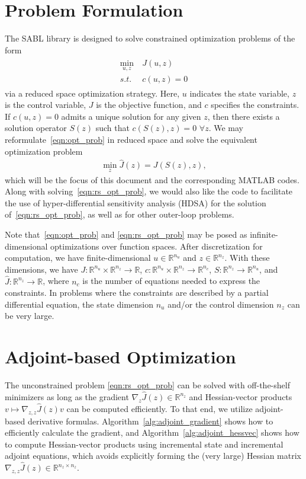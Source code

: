 \documentclass{article}
\def\R{{\mathbb R}}
\begin{document}
\section*{Problem Formulation}

The SABL library is designed to solve constrained optimization problems of the form
\begin{align}
    \label{eqn:opt_prob}
    \begin{aligned}
    \min_{u,z} ~& J(u,z)
    \\
    s.t. ~~& c(u,z) = 0
    \end{aligned}
\end{align}
via a reduced space optimization strategy.
Here, $u$ indicates the state variable, $z$ is the control variable, $J$ is the objective function, and $c$ specifies the constraints.
If $c(u,z)=0$ admits a unique solution for any given $z$, then there exists a solution operator $S(z)$ such that $c(S(z),z)=0$ $\forall z$. We may reformulate~\eqref{eqn:opt_prob} in reduced space and solve the equivalent optimization problem
\begin{align}
    \label{eqn:rs_opt_prob}
    \min_{z } \hat{J}(z)=J(S(z),z),
\end{align}
which will be the focus of this document and the corresponding MATLAB codes. Along with solving~\eqref{eqn:rs_opt_prob}, we would also like the code to facilitate the use of hyper-differential sensitivity analysis (HDSA) for the solution of~\eqref{eqn:rs_opt_prob}, as well as for other outer-loop problems.

Note that~\eqref{eqn:opt_prob} and \eqref{eqn:rs_opt_prob} may be posed as infinite-dimensional optimizations over function spaces.
After discretization for computation, we have finite-dimensional $u\in\R^{n_u}$ and $z\in\R^{n_z}$.
With these dimensions, we have $J:\R^{n_{u}}\times\R^{n_{z}}\to\R$, $c:\R^{n_{u}}\times\R^{n_{z}}\to\R^{n_{c}}$, $S:\R^{n_{z}}\to\R^{n_{u}}$, and $\hat{J}:\R^{n_{z}}\to\R$, where $n_{c}$ is the number of equations needed to express the constraints.
In problems where the constraints are described by a partial differential equation, the state dimension $n_{u}$ and/or the control dimension $n_{z}$ can be very large.

\section*{Adjoint-based Optimization}

The unconstrained problem \eqref{eqn:rs_opt_prob} can be solved with off-the-shelf minimizers as long as the gradient $\nabla_z \hat{J}(z)\in\R^{n_{z}}$ and Hessian-vector products $v\mapsto \nabla_{z,z} \hat{J}(z) v$ can be computed efficiently.
To that end, we utilize adjoint-based derivative formulas.
Algorithm~\ref{alg:adjoint_gradient} shows how to efficiently calculate the gradient, and Algorithm~\ref{alg:adjoint_hessvec} shows how to compute Hessian-vector products using incremental state and incremental adjoint equations, which avoids explicitly forming the (very large) Hessian matrix $\nabla_{z,z}\hat{J}(z)\in\R^{n_{z}\times n_{z}}$.
\end{document}
